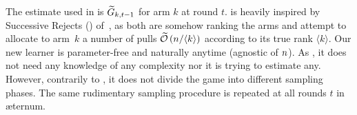 \noindent
The estimate used in \Pone{} is 
$\widetilde{G}_{k,t-1}$ for arm $k$ at round $t$. 
\Pone{} is heavily inspired  by Successive Rejects (\SR{}) of~\citet{Audibert10BA}, as both are somehow ranking the 
arms and attempt to allocate to arm~$k$ a number of pulls 
$\widetilde{\mathcal{O}}\left( n/\langle k\rangle\right)$ according to its true rank $\langle k\rangle$. 
Our new learner is parameter-free and naturally anytime 
(agnostic of $n$).
As \SR{}, it does not need any knowledge 
of any complexity nor it is trying to estimate any. 
However, contrarily to \SR{}, it does not divide the game into different 
sampling phases. The same rudimentary sampling procedure 
is repeated at all rounds $t$ in \ae ternum. %




